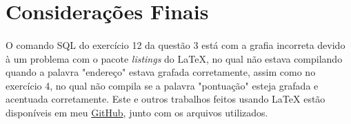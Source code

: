 \documentclass{article}
\begin{document}
\section*{Considerações Finais}
\paragraph{} O comando SQL do exercício 12 da questão 3 está com a grafia incorreta devido à um problema com o pacote \textit{listings} do \LaTeX{}, no qual não estava compilando quando a palavra "endereço" estava grafada corretamente, assim como no exercício 4, no qual não compila se a palavra "pontuação" esteja grafada e acentuada corretamente. Este e outros trabalhos feitos usando \LaTeX{} estão disponíveis em meu \href{https://github.com/gpgp2006/LaTeX}{GitHub}, junto com os arquivos utilizados.
\end{document}
